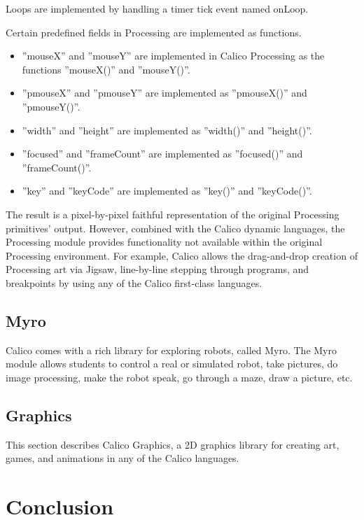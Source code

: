 \documentclass[preprint]{sigplanconf}
\begin{document}
Loops are implemented by handling a timer tick event named onLoop.

Certain predefined fields in Processing are implemented as functions.

\begin{itemize}
\item ''mouseX'' and ''mouseY'' are implemented in Calico Processing as the functions ''mouseX()'' and ''mouseY()''.
\item ''pmouseX'' and ''pmouseY'' are implemented as ''pmouseX()'' and ''pmouseY()''.
\item ''width'' and ''height'' are implemented as ''width()'' and ''height()''.
\item ''focused'' and ''frameCount'' are implemented as ''focused()'' and ''frameCount()''.
\item ''key'' and ''keyCode'' are implemented as ''key()'' and ''keyCode()''.
\end{itemize}

The result is a pixel-by-pixel faithful representation of the original
Processing primitives' output. However, combined with the Calico
dynamic languages, the Processing module provides functionality not
available within the original Processing environment. For example,
Calico allows the drag-and-drop creation of Processing art via Jigsaw,
line-by-line stepping through programs, and breakpoints by using any
of the Calico first-class languages.

\subsection{Myro}

Calico comes with a rich library for exploring robots, called
Myro. The Myro module allows students to control a real or simulated
robot, take pictures, do image processing, make the robot speak, go
through a maze, draw a picture, etc.

\subsection{Graphics}

This section describes Calico Graphics, a 2D graphics library for
creating art, games, and animations in any of the Calico languages.

\section{Conclusion}
\end{document}
